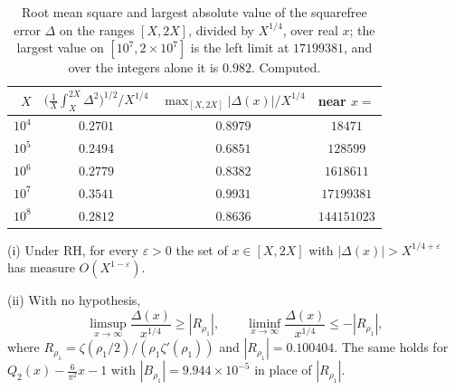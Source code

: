 \begin{table}[htbp]
\centering\small
\begin{tabular}{rccc}
\toprule
$X$ & $\big(\frac1X\int_X^{2X}\Delta^2\big)^{1/2}\big/X^{1/4}$ & $\max_{[X,2X]}|\Delta(x)|/X^{1/4}$ & near $x=$\\
\midrule
$10^4$ & $0.2701$ & $0.8979$ & $18471$\\
$10^5$ & $0.2494$ & $0.6851$ & $128599$\\
$10^6$ & $0.2779$ & $0.8382$ & $1618611$\\
$10^7$ & $0.3541$ & $0.9931$ & $17199381$\\
$10^8$ & $0.2812$ & $0.8636$ & $144151023$\\
\bottomrule
\end{tabular}
\caption{Root mean square and largest absolute value of the squarefree error $\Delta$ on the ranges $[X,2X]$, divided by $X^{1/4}$, over real $x$; the largest value on $[10^7,2\times10^7]$ is the left limit at $17199381$, and over the integers alone it is $0.982$. Computed.}
\label{tab:sqfree:rms}
\end{table}

\begin{corollary}\label{cor:sqfree:omega}
\textup{(i)} Under RH, for every $\varepsilon>0$ the set of $x\in[X,2X]$ with $|\Delta(x)|>X^{1/4+\varepsilon}$ has measure $O(X^{1-\varepsilon})$.

\textup{(ii)} With no hypothesis,
\[
\limsup_{x\to\infty}\frac{\Delta(x)}{x^{1/4}}\ge|R_{\rho_1}|,\qquad\liminf_{x\to\infty}\frac{\Delta(x)}{x^{1/4}}\le-|R_{\rho_1}|,
\]
where $R_{\rho_1}=\zeta(\rho_1/2)/(\rho_1\zeta'(\rho_1))$ and $|R_{\rho_1}|=0.100404$. The same holds for $Q_2(x)-\frac6{\pi^2}x-1$ with $|B_{\rho_1}|=9.944\times10^{-5}$ in place of $|R_{\rho_1}|$.
\end{corollary}

